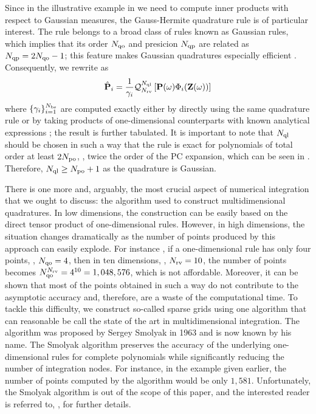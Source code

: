 Since in the illustrative example in  we need to compute inner products with respect to Gaussian measures, the Gauss-Hermite quadrature rule is of particular interest. The rule belongs to a broad class of rules known as Gaussian rules, which implies that its order $N_\text{qo}$ and presicion $N_\text{qp}$ are related as $N_\text{qp} = 2 N_\text{qo} - 1$; this feature makes Gaussian quadratures especially efficient \cite{heiss2008}. Consequently, we rewrite  as
\[
  \hat{\mathbf{P}}_i = \frac{1}{\gamma_i} \mathcal{Q}_{{N_\text{rv}}}^{N_\text{ql}}\left[\mathbf{P}(\omega) \Phi_i(\mathbf{Z}(\omega))\right]
\]
where $\{ \gamma_i \}_{i = 1}^{{N_\text{bs}}}$ are computed exactly either by directly using the same quadrature rule or by taking products of one-dimensional counterparts with known analytical expressions \cite{xiu2010}; the result is further tabulated. It is important to note that $N_\text{ql}$ should be chosen in such a way that the rule is exact for polynomials of total order at least $2 {N_\text{po}}$, \ie, twice the order of the PC expansion, which can be seen in  \cite{eldred2009}. Therefore, $N_\text{ql} \geq {N_\text{po}} + 1$ as the quadrature is Gaussian.

There is one more and, arguably, the most crucial aspect of numerical integration that we ought to discuss: the algorithm used to construct multidimensional quadratures. In low dimensions, the construction can be easily based on the direct tensor product of one-dimensional rules. However, in high dimensions, the situation changes dramatically as the number of points produced by this approach can easily explode. For instance \cite{heiss2008}, if a one-dimensional rule has only four points, \ie, $N_\text{qo} = 4$, then in ten dimensions, \ie, ${N_\text{rv}} = 10$, the number of points becomes $N_\text{qo}^{{N_\text{rv}}} = 4^{10} = 1,048,576$, which is not affordable. Moreover, it can be shown that most of the points obtained in such a way do not contribute to the asymptotic accuracy and, therefore, are a waste of the computational time. To tackle this difficulty, we construct so-called sparse grids using one algorithm that can reasonable be call the state of the art in multidimensional integration. The algorithm was proposed by Sergey Smolyak in 1963 and is now known by his name. The Smolyak algorithm preserves the accuracy of the underlying one-dimensional rules for complete polynomials while significantly reducing the number of integration nodes. For instance, in the example given earlier, the number of points computed by the algorithm would be only $1,581$. Unfortunately, the Smolyak algorithm is out of the scope of this paper, and the interested reader is referred to, \eg, \cite{eldred2009, maitre2010, heiss2008} for further details.
